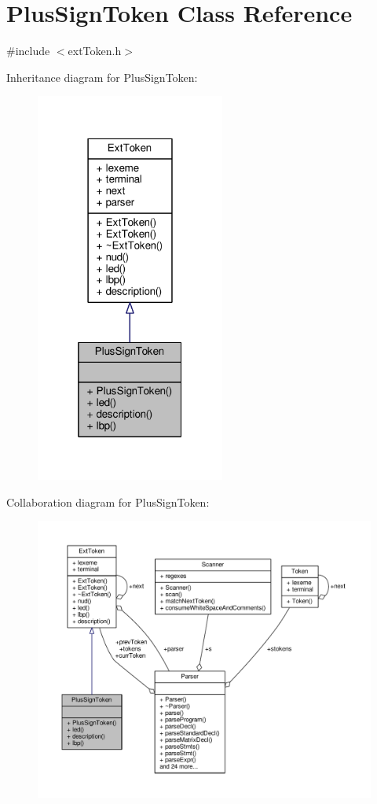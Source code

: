 \hypertarget{classPlusSignToken}{\section{Plus\-Sign\-Token Class Reference}
\label{classPlusSignToken}
}


{\ttfamily \#include $<$ext\-Token.\-h$>$}



Inheritance diagram for Plus\-Sign\-Token\-:\nopagebreak
\begin{figure}[H]
\begin{center}
\leavevmode
\includegraphics[width=176pt]{classPlusSignToken__inherit__graph}
\end{center}
\end{figure}


Collaboration diagram for Plus\-Sign\-Token\-:\nopagebreak
\begin{figure}[H]
\begin{center}
\leavevmode
\includegraphics[width=350pt]{classPlusSignToken__coll__graph}
\end{center}
\end{figure}
